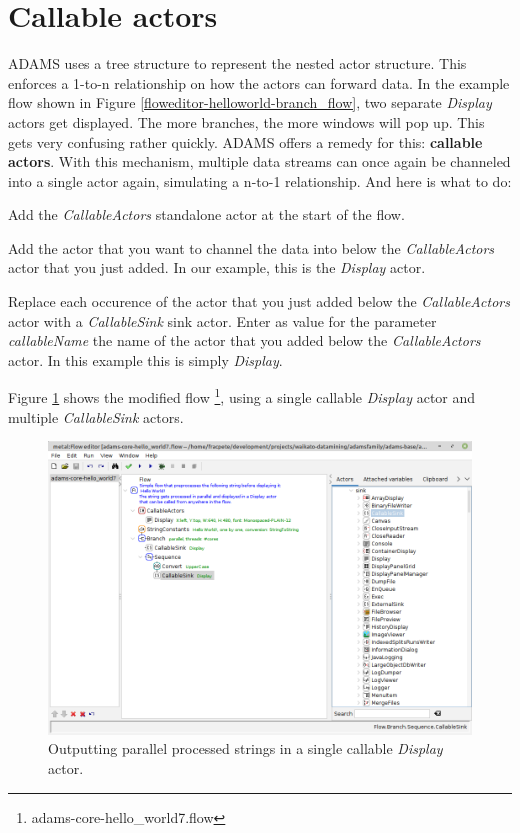 \section{Callable actors}
\label{callable_actors}
ADAMS uses a tree structure to represent the nested actor structure. This
enforces a 1-to-n relationship on how the actors can forward data. In the
example flow shown in Figure \ref{floweditor-helloworld-branch_flow}, two
separate \textit{Display} actors get displayed. The more branches, the more
windows will pop up. This gets very confusing rather quickly. ADAMS offers a
remedy for this: \textbf{callable actors}. With this mechanism, multiple data
streams can once again be channeled into a single actor again, simulating a
n-to-1 relationship. And here is what to do:
\begin{tight_itemize}
	\item Add the \textit{CallableActors} standalone actor at the start of the flow.
	\item Add the actor that you want to channel the data into below the
	\textit{CallableActors} actor that you just added. In our example, this is the
	\textit{Display} actor.
	\item Replace each occurence of the actor that you just added below the
	\textit{CallableActors} actor with a \textit{CallableSink} sink actor. Enter as
	value for the parameter \textit{callableName} the name of the actor that you
	added below the \textit{CallableActors} actor. In this example this is simply
	\textit{Display}.
\end{tight_itemize}
Figure \ref{floweditor-helloworld-callable_display} shows the modified flow
\footnote{adams-core-hello\_world7.flow}, using a single callable \textit{Display}
actor and multiple \textit{CallableSink} actors.
\begin{figure}[htb]
  \centering
  \includegraphics[width=12.0cm]{images/floweditor-helloworld-callable_display.png}
  \caption{Outputting parallel processed strings in a single callable
  \textit{Display} actor.}
  \label{floweditor-helloworld-callable_display}
\end{figure}
